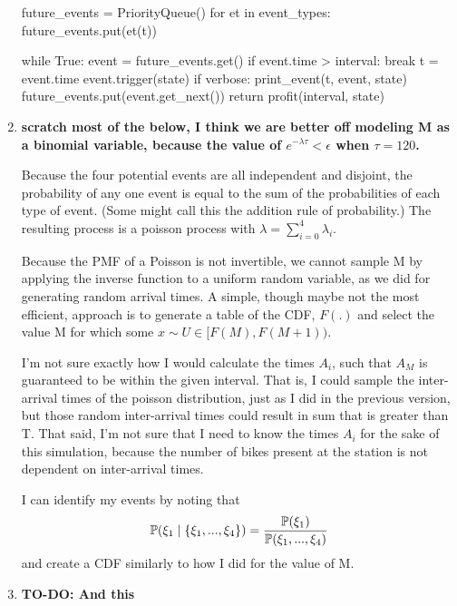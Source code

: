 \begin{solution}
\begin{enumerate}
\begin{python}
    future_events = PriorityQueue()
    for et in event_types:
        future_events.put(et(t))

    while True:
        event = future_events.get()
        if event.time > interval:
            break
        t = event.time
        event.trigger(state)
        if verbose:
            print_event(t, event, state)
        future_events.put(event.get_next())
    return profit(interval, state)
            \end{python}

        \item

            \textbf{scratch most of the below, I think we are better off
                modeling M as a binomial variable, because the value of
            $e^{-\lambda\tau} < \epsilon$ when $\tau=120$.}

            Because the four potential events are all independent and
            disjoint, the probability of any one event is equal to the
            sum of the probabilities of each type of event. (Some might
            call this the addition rule of probability.) The resulting
            process is a poisson process with $\lambda = \sum_{i=0}^4
            \lambda_i$.

            Because the PMF of a Poisson is not invertible, we cannot
            sample M by applying the inverse function to a uniform
            random variable, as we did for generating random arrival
            times. A simple, though maybe not the most efficient,
            approach is to generate a table of the CDF, $F(.)$ and
            select the value M for which some $x \sim U \in [F(M),
            F(M+1))$.

            I'm not sure exactly how I would calculate the times $A_i$,
            such that $A_M$ is guaranteed to be within the given
            interval. That is, I could sample the inter-arrival times of
            the poisson distribution, just as I did in the previous
            version, but those random inter-arrival times could result
            in sum that is greater than T. That said, I'm not sure that
            I need to know the times $A_i$ for the sake of this
            simulation, because the number of bikes present at the
            station is not dependent on inter-arrival times.

            I can identify my events by noting that
            \[
                {\mathbb P}(\xi_1 \mid \{\xi_1,...,\xi_4\}) = \frac{{\mathbb P}(\xi_1)}
                {{\mathbb P}(\xi_1,...,\xi_4)}
            \]
            and create a CDF similarly to how I did for the value of M.

        \item \textbf{TO-DO: And this}
    \end{enumerate}

\end{solution}
